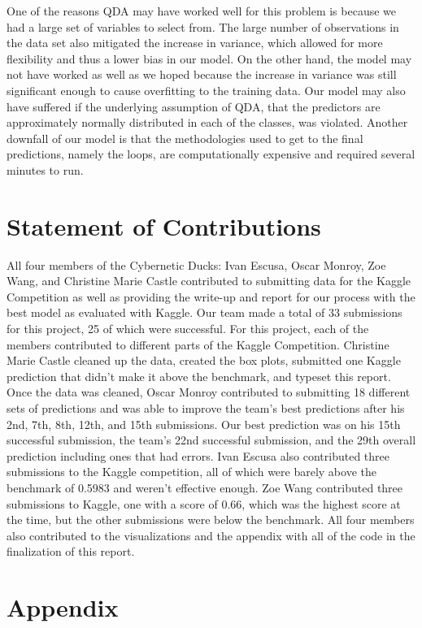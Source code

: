 \documentclass{scrartcl}
\begin{document}
One of the reasons QDA may have worked well for this problem is because we had a large set of variables to select from. The large number of observations in the data set also mitigated the increase in variance, which allowed for more flexibility and thus a lower bias in our model. On the other hand, the model may not have worked as well as we hoped because the increase in variance was still significant enough to cause overfitting to the training data. Our model may also have suffered if the underlying assumption of QDA, that the predictors are approximately normally distributed in each of the classes, was violated. Another downfall of our model is that the methodologies used to get to the final predictions, namely the loops, are computationally expensive and required several minutes to run.

\pagebreak

\section*{Statement of Contributions}

All four members of the Cybernetic Ducks: Ivan Escusa, Oscar Monroy, Zoe Wang, and Christine Marie Castle contributed to submitting data for the Kaggle Competition as well as providing the write-up and report for our process with the best model as evaluated with Kaggle. Our team made a total of 33 submissions for this project, 25 of which were successful. For this project, each of the members contributed to different parts of the Kaggle Competition. Christine Marie Castle cleaned up the data, created the box plots, submitted one Kaggle prediction that didn't make it above the benchmark, and typeset this report. Once the data was cleaned, Oscar Monroy contributed to submitting 18 different sets of predictions and was able to improve the team's best predictions after his 2nd, 7th, 8th, 12th, and 15th submissions. Our best prediction was on his 15th successful submission, the team's 22nd successful submission, and the 29th overall prediction including ones that had errors. Ivan Escusa also contributed three submissions to the Kaggle competition, all of which were barely above the benchmark of 0.5983 and weren't effective enough. Zoe Wang contributed three submissions to Kaggle, one with a score of 0.66, which was the highest score at the time, but the other submissions were below the benchmark. All four members also contributed to the visualizations and the appendix with all of the code in the finalization of this report.

\pagebreak

\section*{Appendix}

\inputminted{R}{mt_final.R}
\end{document}

